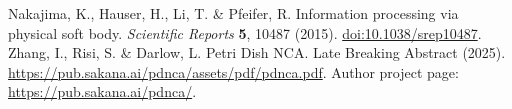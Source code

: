  Nakajima, K., Hauser, H., Li, T. \& Pfeifer, R. Information processing via physical soft body. \textit{Scientific Reports} \textbf{5}, 10487 (2015). \href{https://doi.org/10.1038/srep10487}{doi:10.1038/srep10487}.
 Zhang, I., Risi, S. \& Darlow, L. Petri Dish NCA. Late Breaking Abstract (2025). \url{https://pub.sakana.ai/pdnca/assets/pdf/pdnca.pdf}. Author project page: \url{https://pub.sakana.ai/pdnca/}.
